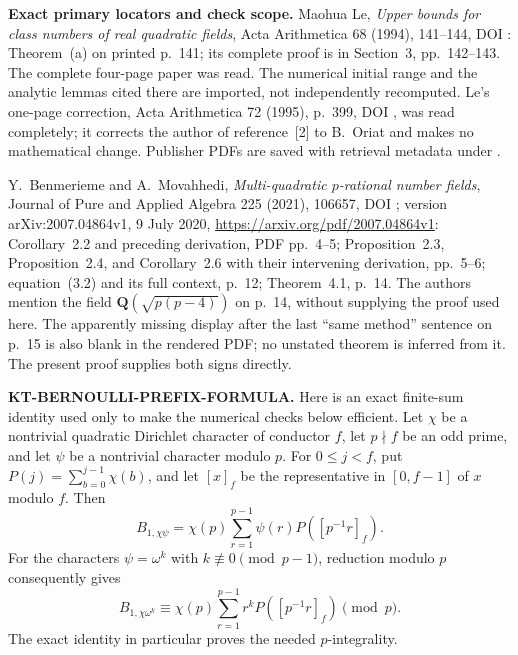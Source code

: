 \documentclass[11pt,a4paper]{article}
\theoremstyle{definition}
\renewcommand{\paragraph}[1]{\par\smallskip\noindent\textbf{#1}\quad\ignorespaces}
\begin{document}
\paragraph{Exact primary locators and check scope.}
Maohua Le, \emph{Upper bounds for class numbers of real quadratic
fields}, Acta Arithmetica 68 (1994), 141--144,
DOI : Theorem~(a) on printed
p.~141; its complete proof is in Section~3, pp.~142--143.
The complete four-page paper was read.  The numerical initial
range and the analytic lemmas cited there are imported, not
independently recomputed.  Le's one-page correction, Acta
Arithmetica 72 (1995), p.~399,
DOI , was read completely; it corrects
the author of reference~[2] to B.~Oriat and makes no mathematical
change.  Publisher PDFs are saved with retrieval metadata under
.

Y.~Benmerieme and A.~Movahhedi, \emph{Multi-quadratic $p$-rational
number fields}, Journal of Pure and Applied Algebra 225 (2021),
106657, DOI ; version
arXiv:2007.04864v1, 9 July 2020,
\url{https://arxiv.org/pdf/2007.04864v1}:
Corollary~2.2 and preceding derivation, PDF pp.~4--5;
Proposition~2.3, Proposition~2.4, and Corollary~2.6 with their
intervening derivation, pp.~5--6; equation~(3.2) and its full
context, p.~12; Theorem~4.1, p.~14.
The authors mention the field $\mathbf Q(\sqrt{p(p-4)})$ on
p.~14, without supplying the proof used here.  The apparently
missing display after the last ``same method'' sentence on p.~15
is also blank in the rendered PDF; no unstated theorem is inferred
from it.  The present proof supplies both signs directly.



\paragraph{KT-BERNOULLI-PREFIX-FORMULA.}
Here is an exact finite-sum identity used only to make the numerical
checks below efficient.  Let $\chi$ be a nontrivial quadratic Dirichlet
character of conductor $f$, let $p\nmid f$ be an odd prime, and let
$\psi$ be a nontrivial character modulo $p$.  For $0\leq j<f$, put
$P(j)=\sum_{b=0}^{j-1}\chi(b)$, and let $[x]_f$ be the representative
in $[0,f-1]$ of $x$ modulo $f$.  Then
\[
 B_{1,\chi\psi}
   =\chi(p)\sum_{r=1}^{p-1}\psi(r)P([p^{-1}r]_f).          \tag{EU.10}
\]
For the characters $\psi=\omega^k$ with
$k\not\equiv0\pmod{p-1}$, reduction modulo $p$ consequently gives
\[
 B_{1,\chi\omega^k}
 \equiv\chi(p)\sum_{r=1}^{p-1}r^kP([p^{-1}r]_f)\pmod p.  \tag{EU.11}
\]
The exact identity in particular proves the needed $p$-integrality.
\end{document}
